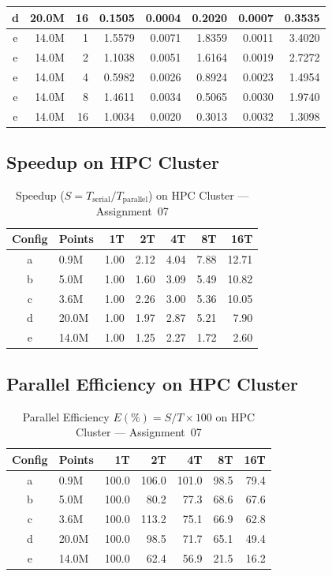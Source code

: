\documentclass[12pt,a4paper]{article}
\begin{document}
\begin{table}[H]
\begin{tabular}{crrrrrrr}
d & 20.0M & 16 & 0.1505 & 0.0004 & 0.2020 & 0.0007 & 0.3535 \\
\midrule
e & 14.0M & 1  & 1.5579 & 0.0071 & 1.8359 & 0.0011 & 3.4020 \\
e & 14.0M & 2  & 1.1038 & 0.0051 & 1.6164 & 0.0019 & 2.7272 \\
e & 14.0M & 4  & 0.5982 & 0.0026 & 0.8924 & 0.0023 & 1.4954 \\
e & 14.0M & 8  & 1.4611 & 0.0034 & 0.5065 & 0.0030 & 1.9740 \\
e & 14.0M & 16 & 1.0034 & 0.0020 & 0.3013 & 0.0032 & 1.3098 \\
\bottomrule
\end{tabular}
\end{table}

\subsection{Speedup on HPC Cluster}

\begin{table}[H]
\centering
\caption{Speedup ($S = T_{\text{serial}} / T_{\text{parallel}}$) on HPC Cluster --- Assignment~07}
\label{tab:a7_speedup}
\begin{tabular}{clrrrrr}
\toprule
\textbf{Config} & \textbf{Points} & \textbf{1T} & \textbf{2T} & \textbf{4T} & \textbf{8T} & \textbf{16T} \\
\midrule
a & 0.9M  & 1.00 & 2.12 & 4.04 & 7.88 & 12.71 \\
b & 5.0M  & 1.00 & 1.60 & 3.09 & 5.49 & 10.82 \\
c & 3.6M  & 1.00 & 2.26 & 3.00 & 5.36 & 10.05 \\
d & 20.0M & 1.00 & 1.97 & 2.87 & 5.21 &  7.90 \\
e & 14.0M & 1.00 & 1.25 & 2.27 & 1.72 &  2.60 \\
\bottomrule
\end{tabular}
\end{table}

\subsection{Parallel Efficiency on HPC Cluster}

\begin{table}[H]
\centering
\caption{Parallel Efficiency $E(\%) = S/T \times 100$ on HPC Cluster --- Assignment~07}
\label{tab:a7_efficiency}
\begin{tabular}{clrrrrr}
\toprule
\textbf{Config} & \textbf{Points} & \textbf{1T} & \textbf{2T} & \textbf{4T} & \textbf{8T} & \textbf{16T} \\
\midrule
a & 0.9M  & 100.0 & 106.0 & 101.0 & 98.5  & 79.4 \\
b & 5.0M  & 100.0 &  80.2 &  77.3 & 68.6  & 67.6 \\
c & 3.6M  & 100.0 & 113.2 &  75.1 & 66.9  & 62.8 \\
d & 20.0M & 100.0 &  98.5 &  71.7 & 65.1  & 49.4 \\
e & 14.0M & 100.0 &  62.4 &  56.9 & 21.5  & 16.2 \\
\bottomrule
\end{tabular}
\end{table}
\end{document}
